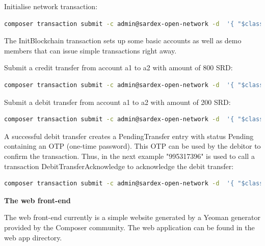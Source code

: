 Initialise network transaction:

\begin{lstlisting}[language=bash]
	composer transaction submit -c admin@sardex-open-network -d  '{ "$class": "net.sardex.interlace.InitBlockchain" }'
\end{lstlisting}

The InitBlockchain transaction sets up some basic accounts as well as demo members that can issue simple transactions right away.

Submit a credit transfer from account a1 to a2 with amount of 800 SRD:

\begin{lstlisting}[language=bash]
	composer transaction submit -c admin@sardex-open-network -d  '{ "$class": "net.sardex.interlace.CreditTransfer", "amount": 800, "senderAccount": "resource:net.sardex.interlace.CCAccount#a1", "recipientAccount": "resource:net.sardex.interlace.CCAccount#a2" }'
\end{lstlisting}

Submit a debit transfer from account a1 to a2 with amount of 200 SRD:

\begin{lstlisting}[language=bash]
	composer transaction submit -c admin@sardex-open-network -d  '{ "$class": "net.sardex.interlace.DebitTransfer", "amount": 200, "senderAccount": "resource:net.sardex.interlace.CCAccount#a1", "recipientAccount": "resource:net.sardex.interlace.CCAccount#a2" }'
\end{lstlisting}

A successful debit transfer creates a PendingTransfer entry with status Pending containing an OTP (one-time password). This OTP can be used by the debitor to confirm the transaction. Thus, in the next example "995317396" is used to call a transaction DebitTransferAcknowledge to acknowledge the debit transfer:

\begin{lstlisting}[language=bash]
	composer transaction submit -c admin@sardex-open-network -d  '{ "$class": "net.sardex.interlace.DebitTransferAcknowledge", "transfer": "resource:net.sardex.interlace.PendingTransfer#995317396" }'
\end{lstlisting}

\textbf{The web front-end}

The web front-end currently is a simple website generated by a Yeoman generator provided by the Composer community. The web application can be found in the web app directory.

